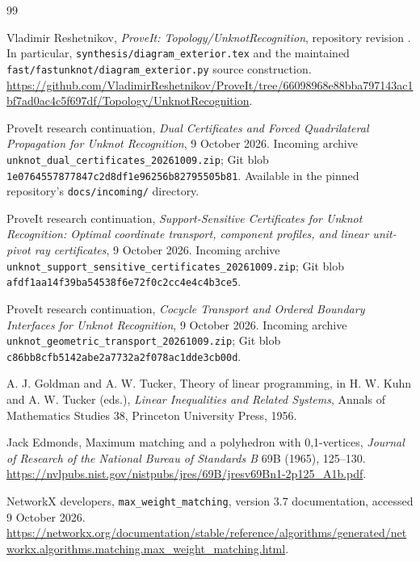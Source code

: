 \clearpage
\begin{thebibliography}{99}
\small\raggedright
\setlength{\itemsep}{1.5pt}
\setlength{\parsep}{0pt}
\setlength{\parskip}{0pt}

Vladimir Reshetnikov, \emph{ProveIt: Topology/UnknotRecognition}, repository
revision \basecommit. In particular,
\texttt{synthesis/diagram\_exterior.tex} and the maintained
\texttt{fast/fastunknot/diagram\_exterior.py} source construction.
\url{https://github.com/VladimirReshetnikov/ProveIt/tree/66098968e88bba797143ac1bf7ad0ac4c5f697df/Topology/UnknotRecognition}.

ProveIt research continuation, \emph{Dual Certificates and Forced Quadrilateral Propagation for Unknot Recognition},
9 October 2026. Incoming archive
\texttt{unknot\_dual\_certificates\_20261009.zip}; Git blob
\texttt{1e0764557877847c2d8df1e96256b82795505b81}.
Available in the pinned repository's \texttt{docs/incoming/} directory.

ProveIt research continuation, \emph{Support-Sensitive Certificates for
Unknot Recognition: Optimal coordinate transport, component profiles,
and linear unit-pivot ray certificates}, 9 October 2026. Incoming archive
\texttt{unknot\_support\_sensitive\_certificates\_20261009.zip}; Git blob
\texttt{afdf1aa14f39ba54538f6e72f0c2cc4e4c4b3ce5}.

ProveIt research continuation, \emph{Cocycle Transport and Ordered Boundary Interfaces for Unknot Recognition},
9 October 2026. Incoming archive
\texttt{unknot\_geometric\_transport\_20261009.zip}; Git blob
\texttt{c86bb8cfb5142abe2a7732a2f078ac1dde3cb00d}.

A. J. Goldman and A. W. Tucker, Theory of linear programming,
in H. W. Kuhn and A. W. Tucker (eds.), \emph{Linear Inequalities and
Related Systems}, Annals of Mathematics Studies 38, Princeton University
Press, 1956.

Jack Edmonds, Maximum matching and a polyhedron with 0,1-vertices,
\emph{Journal of Research of the National Bureau of Standards B}
69B (1965), 125--130.
\url{https://nvlpubs.nist.gov/nistpubs/jres/69B/jresv69Bn1-2p125_A1b.pdf}.

NetworkX developers, \texttt{max\_weight\_matching}, version 3.7
documentation, accessed 9 October 2026.
\url{https://networkx.org/documentation/stable/reference/algorithms/generated/networkx.algorithms.matching.max_weight_matching.html}.


\end{thebibliography}
